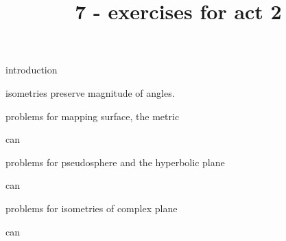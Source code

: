 \documentclass{article}
\title{7 - exercises for act 2}
\newenvironment{andrew_section}[1]
    {
    \section{#1}
    \begin{itemize}
    }
    {
    \end{itemize}
    }
\begin{document}
\maketitle

\begin{andrew_section}{introduction}
    \item 
        isometries preserve magnitude of angles.  

\end{andrew_section}

\begin{andrew_section}{problems for mapping surface, the metric}
    \item 
        can 
\end{andrew_section}

\begin{andrew_section}{problems for pseudosphere and the hyperbolic plane}
    \item 
        can 
\end{andrew_section}

\begin{andrew_section}{problems for isometries of complex plane}
    \item 
        can 
\end{andrew_section}
\end{document}
